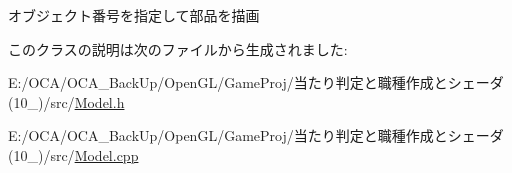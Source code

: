 オブジェクト番号を指定して部品を描画 



このクラスの説明は次のファイルから生成されました\-:\begin{DoxyCompactItemize}
\item 
E\-:/\-O\-C\-A/\-O\-C\-A\-\_\-\-Back\-Up/\-Open\-G\-L/\-Game\-Proj/当たり判定と職種作成とシェーダ(10\-\_)/src/\hyperlink{_model_8h}{Model.\-h}\item 
E\-:/\-O\-C\-A/\-O\-C\-A\-\_\-\-Back\-Up/\-Open\-G\-L/\-Game\-Proj/当たり判定と職種作成とシェーダ(10\-\_)/src/\hyperlink{_model_8cpp}{Model.\-cpp}\end{DoxyCompactItemize}
